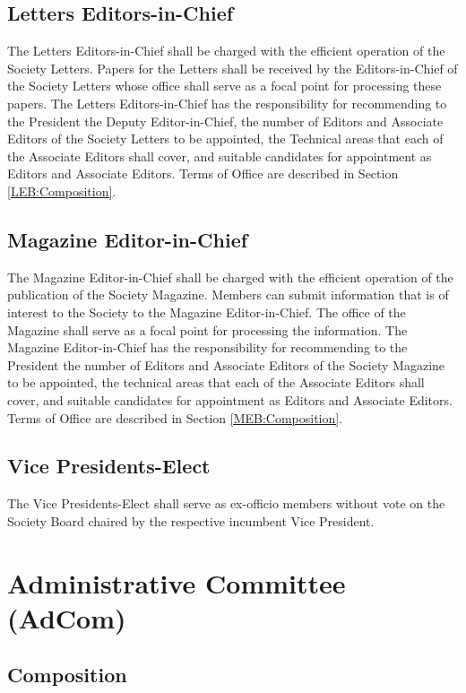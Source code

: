 \documentclass[10pt]{article}
\newcommand{\secref}[1]{Section \ref{#1}}
\begin{document}
\subsection{Letters Editors-in-Chief}

The Letters Editors-in-Chief shall be charged with the efficient operation of the Society Letters.  Papers for the Letters shall be received by the Editors-in-Chief of the Society Letters whose office shall serve as a focal point for processing these papers.  The Letters Editors-in-Chief has the responsibility for recommending to the President the Deputy Editor-in-Chief, the number of Editors and Associate Editors of the Society Letters to be appointed, the Technical areas that each of the Associate Editors shall cover, and suitable candidates for appointment as Editors and Associate Editors. Terms of Office are described in \secref{LEB:Composition}.


\subsection{Magazine Editor-in-Chief}

The Magazine Editor-in-Chief shall be charged with the efficient operation of the publication of the Society Magazine. Members can submit information that is of interest to the Society to the Magazine Editor-in-Chief. The office of the Magazine shall serve as a focal point for processing the information. The Magazine Editor-in-Chief has the responsibility for recommending to the President the number of Editors and Associate Editors of the Society Magazine to be appointed, the technical areas that each of the Associate Editors shall cover, and suitable candidates for appointment as Editors and Associate Editors. Terms of Office are described in \secref{MEB:Composition}. 


\subsection{Vice Presidents-Elect}

The Vice Presidents-Elect shall serve as ex-officio members without vote on the Society Board chaired by the respective incumbent Vice President.


\section{Administrative Committee (AdCom)}
\label{AdCom}

\subsection{Composition}
\label{AdCom:Composition}
\end{document}
